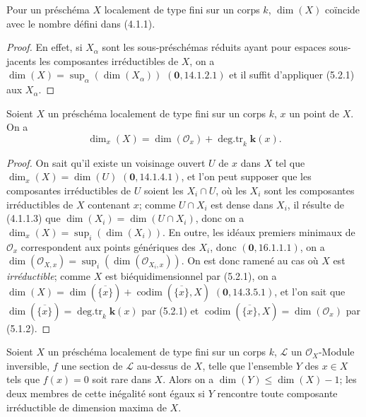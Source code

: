 \begin{corollary}[5.2.2]
\label{IV.2.5.2.2-fr}
Pour un préschéma $X$ localement de type fini sur un corps $k$, $\dim(X)$
coïncide avec le nombre défini dans \textup{(4.1.1)}.
\end{corollary}

\begin{proof}
En effet, si $X_\alpha$ sont les sous-préschémas réduits ayant pour espaces
sous-jacents les composantes irréductibles de $X$, on a
$\dim(X)=\sup_\alpha(\dim(X_\alpha))$ $(\mathbf{0},14.1.2.1)$ et il suffit d'appliquer
(5.2.1) aux $X_\alpha$.
\end{proof}

\begin{corollary}[5.2.3]
Soient $X$ un préschéma localement de type fini sur un corps $k$, $x$ un
point de $X$. On a
\begin{equation}
\dim_x(X)=\dim(\mathcal O_x)+\operatorname{deg.tr}_k \boldsymbol{k}(x).
\tag{5.2.3.1}\label{IV.2.5.2.3.1-fr}
\end{equation}
\end{corollary}

\begin{proof}
On sait qu'il existe un voisinage ouvert $U$ de $x$ dans $X$ tel que
$\dim_x(X)=\dim(U)$ $(\mathbf{0},14.1.4.1)$, et l'on peut supposer que les composantes
irréductibles de $U$ soient les $X_i\cap U$, où les $X_i$ sont les
composantes irréductibles de $X$ contenant $x$; comme $U\cap X_i$
est dense dans $X_i$, il résulte de (4.1.1.3) que
$\dim(X_i)=\dim(U\cap X_i)$, donc on a
$\dim_x(X)=\sup_i(\dim(X_i))$. En outre, les idéaux premiers minimaux de
$\mathcal O_x$ correspondent aux points génériques des $X_i$, donc
$(\mathbf{0},16.1.1.1)$, on a
$\dim(\mathcal O_{X,x})=\sup_i(\dim(\mathcal O_{X_i,x}))$. On est donc ramené
au cas où $X$ est \emph{irréductible}; comme $X$ est biéquidimensionnel par
(5.2.1), on a
$\dim(X)=\dim(\overline{\{x\}})+\operatorname{codim}(\overline{\{x\}},X)$
$(\mathbf{0},14.3.5.1)$, et l'on sait que
$\dim(\overline{\{x\}})=\operatorname{deg.tr}_k \boldsymbol{k}(x)$ par (5.2.1) et
$\operatorname{codim}(\overline{\{x\}},X)=\dim(\mathcal O_x)$ par (5.1.2).
\end{proof}

\begin{corollary}[5.2.4]
\label{IV.2.5.2.4-fr}
Soient $X$ un préschéma localement de type fini sur un corps $k$, $\mathcal L$
un $\mathcal O_X$-Module inversible, $f$ une section de $\mathcal L$ au-dessus
de $X$, telle que l'ensemble $Y$ des $x\in X$ tels que $f(x)=0$ soit rare
dans $X$. Alors on a $\dim(Y)\leq\dim(X)-1$; les deux membres de cette
inégalité sont égaux si $Y$ rencontre toute composante irréductible de
dimension maxima de $X$.
\end{corollary}

